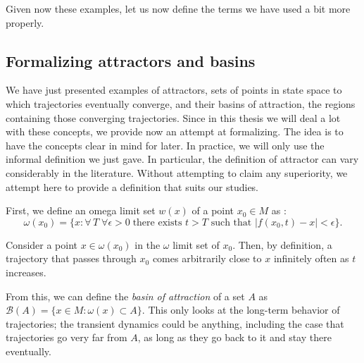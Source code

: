Given now these examples, let us now define the terms we have used a bit more properly. 

% 
\subsection{Formalizing attractors and basins}\label{method:attractors-formal}
We have just presented examples of attractors, sets of points in state space to which trajectories eventually converge, and their basins of attraction, the regions containing those converging trajectories. Since in this thesis we will deal a lot with these concepts, we provide now an attempt at formalizing. The idea is to have the concepts clear in mind for later. In practice, we will only use the informal definition we just gave. In particular, the definition of attractor can vary considerably in the literature. Without attempting to claim any superiority, we attempt here to provide a definition that suits our studies.  

First, we define an omega limit set $w(x)$ of a point $x_0 \in M$ as \cite{milnor1985on}: 
% 
\begin{equation}
    \omega(x_0) = \{x: \forall\,T \;\forall \epsilon > 0\; \text{there exists } t > T \text{ such that } |f(x_0, t) - x| < \epsilon    \}.
\end{equation}

Consider a point $x \in\omega(x_0)$ in the $\omega$ limit set of $x_0$. Then, by definition, a trajectory that passes through $x_0$ comes arbitrarily close to $x$ infinitely often as $t$ increases. 

From this, we can define the \textit{basin of attraction} of a set $A$ as $\mathcal{B}(A) = \{x \in M: \omega(x) \subset A\}$. This only looks at the long-term behavior of trajectories; the transient dynamics could be anything, including the case that trajectories go very far from $A$, as long as they go back to it and stay there eventually. 


